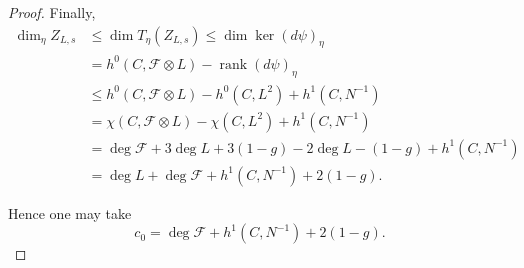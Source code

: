\documentclass[10pt,a4paper]{amsart}
\begin{document}
\begin{proof}
Finally,
\begin{align*}
\dim_{\eta} Z_{L,s}
&\le
\dim T_\eta(Z_{L,s})
\le \dim\ker\!\left(d\psi\right)_\eta\\
&= h^0(C,\mathcal{F}\otimes L)-\operatorname{rank}(d\psi)_\eta\\
&\le
h^0(C,\mathcal{F}\otimes L)
-
h^0(C,L^2)+h^1(C,N^{-1})\\
&=
\chi(C,\mathcal{F}\otimes L)
-
\chi(C,L^2)
+
h^1(C,N^{-1})\\
&=
\deg\mathcal{F}
+3\deg L
+3(1-g)
-
2\deg L
-(1-g)
+
h^1(C,N^{-1})\\
&=
\deg L
+\deg\mathcal{F}
+h^1(C,N^{-1})
+2(1-g).
\end{align*}

Hence one may take
\[
c_0
=
\deg\mathcal{F}
+h^1(C,N^{-1})
+2(1-g).
\]
\end{proof}
\end{document}
